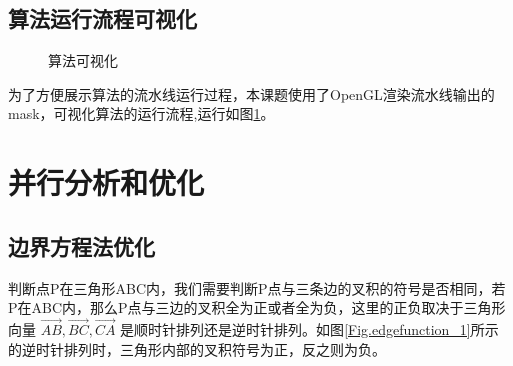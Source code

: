 \subsection{算法运行流程可视化}

\begin{figure}[h]
    \centering

    \caption{\label{fig:visualisition}算法可视化}
\end{figure}
为了方便展示算法的流水线运行过程，本课题使用了OpenGL渲染流水线输出的mask，可视化算法的运行流程,运行如图\ref{fig:visualisition}。



\section{并行分析和优化}


\subsection{边界方程法优化}
判断点P在三角形ABC内，我们需要判断P点与三条边的叉积的符号是否相同，若P在ABC内，那么P点与三边的叉积全为正或者全为负，这里的正负取决于三角形向量 $\overrightarrow{AB},\overrightarrow{BC},\overrightarrow{CA}$ 是顺时针排列还是逆时针排列。如图\ref{Fig.edgefunction_1}所示的逆时针排列时，三角形内部的叉积符号为正，反之则为负。

